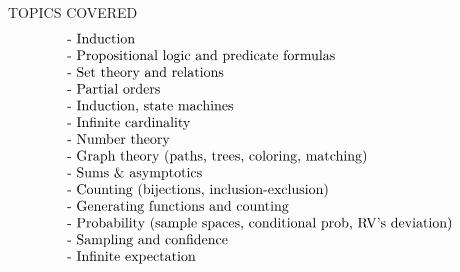 \documentclass[quiz]{mcs}
\begin{document}
\final

\begin{editingnotes}
TOPICS COVERED
\[\begin{tabular}{lr}
- Induction\\
- Propositional logic and predicate formulas                    \\
- Set theory and relations                                      \\
- Partial orders                                                \\
- Induction, state machines                                     \\
- Infinite cardinality                                          \\
- Number theory                                                 \\
- Graph theory (paths, trees, coloring, matching)               \\
- Sums \& asymptotics                                \\
- Counting (bijections, inclusion-exclusion)               \\
- Generating functions and counting                             \\
- Probability (sample spaces, conditional prob, RV's deviation) \\
- Sampling and  confidence                                     \\
- Infinite expectation
\end{tabular}\]\end{editingnotes}



\examspace
{}

\examspace
{}

\examspace
{}

\examspace
{}
\end{document}
